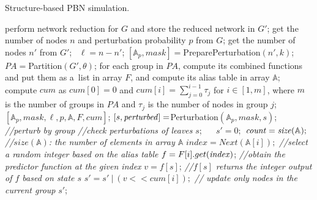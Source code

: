 \documentclass[runningheads,a4paper]{llncs}
\newcommand\CodeIndent{\hspace{1em}}
\begin{document}
%

\begin{algorithm}[!t]
\caption{Structure-based PBN simulation.}
\label{alg:slp}
\begin{algorithmic}[1]
		\State perform network reduction for $G$ and store the reduced network in $G'$;
		\State get the number of nodes $n$ and perturbation probability $p$ from $G$;
		\State get the number of nodes $n'$ from $G'$; ~$\ell=n-n'$;%
		\State $[\mathbb{A}_p, mask]=${\sc PreparePerturbation}$(n',k)$;
		\State $PA=${\sc Partition}$(G',\theta)$;
		\State for each group in $PA$, compute its combined functions 
		\State \CodeIndent and put them as a~list in array
            $F$, and compute its alias table in array $\mathbb{A}$;
    \State compute $cum$ as $cum[0]=0$ and $cum[i]=\sum_{j=0}^{i-1}\tau_j$ for $i\in [1,m]$,
     where $m$ is
    \State \CodeIndent  the number of groups in $PA$ and $\tau_j$ is the number of nodes in group $j$;
    \State \Return $[\mathbb{A}_p, mask, \ell, p, \mathbb{A}, F, cum]$;
\EndProcedure
{}
	\State $[s, {\it perturbed}]=${\sc Perturbation}$(\mathbb{A}_p,mask,s)$; \hfill{\it //perturb by group} \label{alg-line:perturbaion}
     \hfill{\it //check perturbations of leaves}
    \State \Return $s$; 
    \label{alg-line:checkleaf}
    \Else~~ $s'=0;$ ${\it count=size(\mathbb{A})};$ \hfill{\it //$size(\mathbb{A})$: the number of elements in array $\mathbb{A}$}
    \State $index=Next(\mathbb{A}[i]);$ \hfill{\it //select a random integer based on the alias table}
    \State$f=F[i].get({\it index})$; \hfill{\it //obtain the predictor function at the given index}
    \label{alg-line:start}
    \State $v=f[s]$; \hfill{\it //$f[s]$ returns the integer output of $f$ based on state $s$}
    \State $s'=s'~|~(v<\!\!\!<cum[i]);$ \hfill{\it // update only nodes in the current group}
    \label{alg-line:cum}
  \EndFor
    \EndIf
	\State \Return $s'$;
\EndProcedure
\end{algorithmic}
\end{algorithm}
\end{document}

